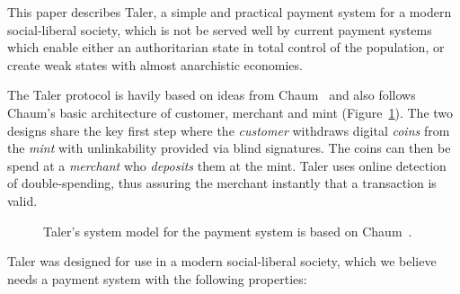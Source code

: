 \documentclass{llncs}
\begin{document}
This paper describes Taler, a simple and practical payment system for
a modern social-liberal society, which is not be served well by
current payment systems which enable either an authoritarian state in
total control of the population, or create weak states with almost
anarchistic economies.

The Taler protocol is havily based on ideas from
Chaum~\cite{chaum1983blind} and also follows Chaum's basic architecture of
customer, merchant and mint (Figure~\ref{fig:cmm}). The two designs
share the key first step where the {\em customer} withdraws digital
{\em coins} from the {\em mint} with unlinkability provided via blind
signatures.  The coins can then be spend at a {\em merchant} who {\em
  deposits} them at the mint.  Taler uses online detection of
double-spending, thus assuring the merchant instantly that a
transaction is valid.

\begin{figure}[h]
\centering
{}
\caption{Taler's system model for the payment system is based on Chaum~\cite{chaum1983blind}.}
\label{fig:cmm}
\end{figure}

Taler was designed for use in a modern social-liberal society, which we
believe needs a payment system with the following properties:
\end{document}
